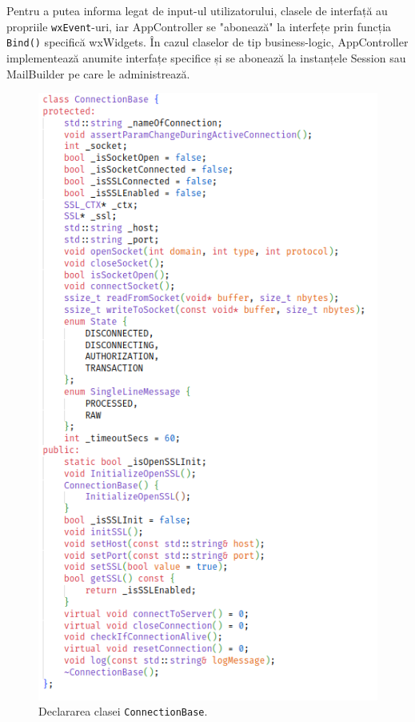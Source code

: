 \documentclass[runningheads]{llncs}
\begin{document}
Pentru a putea informa legat de input-ul utilizatorului, clasele de interfață au propriile \texttt{wxEvent}-uri, iar AppController se "abonează" la interfețe prin funcția \texttt{Bind()} specifică wxWidgets. În cazul claselor de tip business-logic, AppController implementează anumite interfațe specifice și se abonează la instanțele Session sau MailBuilder pe care le administrează.


\begin{figure}
    \centering
    \includegraphics[width=\textwidth]{connectionBase.png}
    \caption{Declararea clasei \texttt{ConnectionBase}.}
    \label{fig:connectionBase}
\end{figure}
\end{document}

